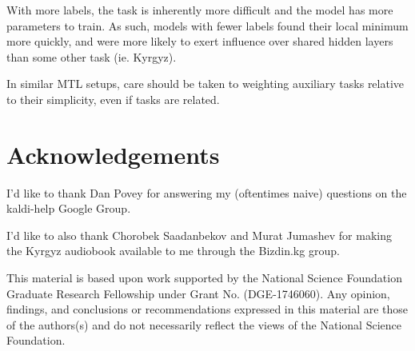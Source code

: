 \documentclass[a4paper]{article}
\begin{document}
With more labels, the task is inherently more difficult and the model has more parameters to train. As such, models with fewer labels found their local minimum more quickly, and were more likely to exert influence over shared hidden layers than some other task (ie. Kyrgyz).

In similar MTL setups, care should be taken to weighting auxiliary tasks relative to their simplicity, even if tasks are related.



\section{Acknowledgements}

I'd like to thank Dan Povey for answering my (oftentimes naive) questions on the kaldi-help Google Group.

I'd like to also thank Chorobek Saadanbekov and Murat Jumashev for making the Kyrgyz audiobook available to me through the Bizdin.kg group.

This material is based upon work supported by the National Science Foundation Graduate Research Fellowship under Grant No. (DGE-1746060). Any opinion, findings, and conclusions or recommendations expressed in this material are those of the authors(s) and do not necessarily reflect the views of the National Science Foundation.





\newpage



\end{document}
